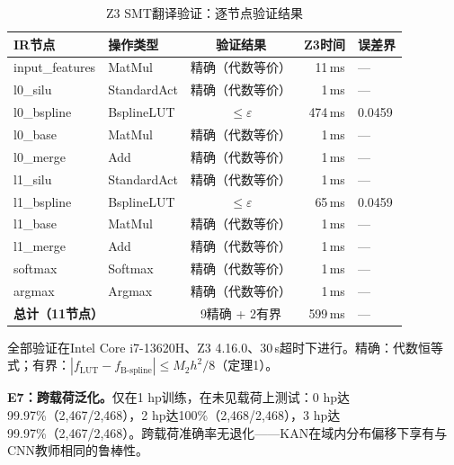 \documentclass[journal,onecolumn]{IEEEtran}
\theoremstyle{definition}
\theoremstyle{plain}
\theoremstyle{remark}
\begin{document}
\begin{table}[!t]
    \centering
    \caption{Z3 SMT翻译验证：逐节点验证结果}
    \label{tab:z3_smt}
    \footnotesize
    \begin{tabular}{@{}llcrl@{}}
        \toprule
        \textbf{IR节点} & \textbf{操作类型} & \textbf{验证结果} & \textbf{Z3时间} & \textbf{误差界} \\
        \midrule
        input\_features & MatMul      & 精确（代数等价）  & 11\,ms  & --- \\
        l0\_silu       & StandardAct & 精确（代数等价）  & 1\,ms   & --- \\
        l0\_bspline    & BsplineLUT  & $\leq\varepsilon$  & 474\,ms & 0.0459 \\
        l0\_base       & MatMul      & 精确（代数等价）  & 1\,ms   & --- \\
        l0\_merge      & Add         & 精确（代数等价）  & 1\,ms   & --- \\
        l1\_silu       & StandardAct & 精确（代数等价）  & 1\,ms   & --- \\
        l1\_bspline    & BsplineLUT  & $\leq\varepsilon$  & 65\,ms  & 0.0459 \\
        l1\_base       & MatMul      & 精确（代数等价）  & 1\,ms   & --- \\
        l1\_merge      & Add         & 精确（代数等价）  & 1\,ms   & --- \\
        softmax        & Softmax     & 精确（代数等价）  & 1\,ms   & --- \\
        argmax         & Argmax      & 精确（代数等价）  & 1\,ms   & --- \\
        \midrule
        \multicolumn{2}{l}{\textbf{总计（11节点）}} & 9精确 + 2有界 & 599\,ms & --- \\
        \bottomrule
    \end{tabular}
    \vspace{2pt}
    {\scriptsize 全部验证在Intel Core i7-13620H、Z3 4.16.0、30\,s超时下进行。精确：代数恒等式；有界：$|f_{\text{LUT}} - f_{\text{B-spline}}| \leq M_2 h^2/8$（定理1）。}
\end{table}

\noindent\textbf{E7：跨载荷泛化。}仅在1 hp训练，在未见载荷上测试：0 hp达99.97\%（2,467/2,468），2 hp达100\%（2,468/2,468），3 hp达99.97\%（2,467/2,468）。跨载荷准确率无退化——KAN在域内分布偏移下享有与CNN教师相同的鲁棒性。
\end{document}
